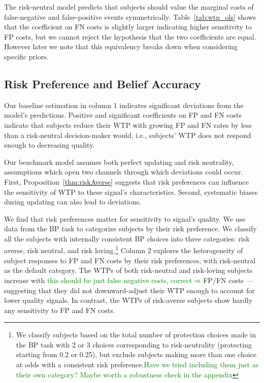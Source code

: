 \documentclass[12pt,a4paper]{article}
\begin{document}
		


The risk-neutral model predicts that subjects should value the marginal costs of false-negative and false-positive events symmetrically. Table~\ref{tab:wtp_ols} shows that the coefficient on FN costs is slightly larger indicating higher sensitivity to FP costs, but we cannot reject the hypothesis that the two coefficients are equal. However later we note that this equivalency breaks down when considering specific priors.

\subsection{Risk Preference and Belief Accuracy}

Our baseline estimation in column 1 indicates significant deviations from the model's predictions. Positive and significant coefficients on FP and FN costs indicate that subjects reduce their WTP with growing FP and FN rates by less than a risk-neutral decision-maker would, i.e., subjects' WTP does not respond enough to decreasing quality.

Our benchmark model assumes both perfect updating and risk neutrality, assumptions which open two channels through which deviations could occur. First, Proposition~\ref{thm:riskAverse} suggests that risk preferences can influence the sensitivity of WTP to these signal's characteristics. Second, systematic biases during updating can also lead to deviations. 

We find that risk preferences matter for sensitivity to signal's quality. We use data from the BP task to categorize subjects by their risk preference. We classify all the subjects with internally consistent BP choices into three categories: risk averse, risk neutral, and risk loving.\footnote{We classify subjects based on the total number of protection choices made in the BP task with 2 or 3 choices corresponding to risk-neutrality (protecting starting from 0.2 or 0.25), but exclude subjects making more than one choice at odds with a consistent risk preference.\textcolor{green}{Have we tried including them just as their own category?  Maybe worth a robustness check in the appendix}} Column 2 explores the heterogeneity of subject responses to FP and FN costs by their risk preferences, with risk-neutral as the default category. 
The WTPs of both risk-neutral and risk-loving subjects increase with \textcolor{green}{this should be just false negative costs, correct$\Rightarrow$}FP/FN costs --- suggesting that they did not downward-adjust their WTP enough to account for lower quality signals. In contrast, the WTPs of risk-averse subjects show hardly any sensitivity to FP and FN costs.  
\end{document}
